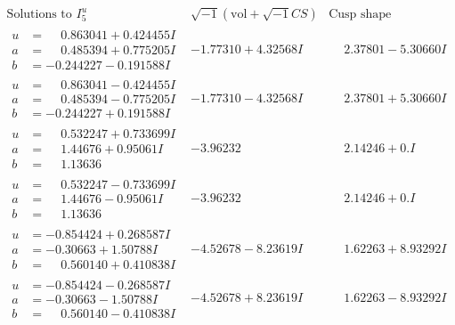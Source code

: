 \documentclass[1p]{elsarticle_modified}
\theoremstyle{definition}
\newcommand{\I}{\sqrt{-1}}
\begin{document}
$$\begin{array}{c|c|c}  
\text{Solutions to }I^u_{5}& \I (\text{vol} + \sqrt{-1}CS) & \text{Cusp shape}\\
 \hline 
\begin{aligned}
u &= \phantom{-}0.863041 + 0.424455 I \\
a &= \phantom{-}0.485394 + 0.775205 I \\
b &= -0.244227 - 0.191588 I\end{aligned}
 & -1.77310 + 4.32568 I & \phantom{-}2.37801 - 5.30660 I \\ \hline\begin{aligned}
u &= \phantom{-}0.863041 - 0.424455 I \\
a &= \phantom{-}0.485394 - 0.775205 I \\
b &= -0.244227 + 0.191588 I\end{aligned}
 & -1.77310 - 4.32568 I & \phantom{-}2.37801 + 5.30660 I \\ \hline\begin{aligned}
u &= \phantom{-}0.532247 + 0.733699 I \\
a &= \phantom{-}1.44676 + 0.95061 I \\
b &= \phantom{-}1.13636\phantom{ +0.000000I}\end{aligned}
 & -3.96232\phantom{ +0.000000I} & \phantom{-}2.14246 + 0. I\phantom{ +0.000000I} \\ \hline\begin{aligned}
u &= \phantom{-}0.532247 - 0.733699 I \\
a &= \phantom{-}1.44676 - 0.95061 I \\
b &= \phantom{-}1.13636\phantom{ +0.000000I}\end{aligned}
 & -3.96232\phantom{ +0.000000I} & \phantom{-}2.14246 + 0. I\phantom{ +0.000000I} \\ \hline\begin{aligned}
u &= -0.854424 + 0.268587 I \\
a &= -0.30663 + 1.50788 I \\
b &= \phantom{-}0.560140 + 0.410838 I\end{aligned}
 & -4.52678 - 8.23619 I & \phantom{-}1.62263 + 8.93292 I \\ \hline\begin{aligned}
u &= -0.854424 - 0.268587 I \\
a &= -0.30663 - 1.50788 I \\
b &= \phantom{-}0.560140 - 0.410838 I\end{aligned}
 & -4.52678 + 8.23619 I & \phantom{-}1.62263 - 8.93292 I \\ \hline\begin{aligned}

\end{aligned}
\end{array}$$
\end{document}
